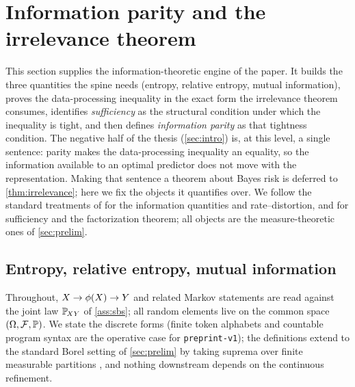\section{Information parity and the irrelevance theorem}
\label{sec:parity}

%

This section supplies the information-theoretic engine of the paper. It builds
the three quantities the spine needs (entropy, relative entropy, mutual
information), proves the data-processing inequality in the exact form the
irrelevance theorem consumes, identifies \emph{sufficiency} as the structural
condition under which the inequality is tight, and then defines
\emph{information parity} as that tightness condition. The negative half of
the thesis (\cref{sec:intro}) is, at this level, a single sentence: parity
makes the data-processing inequality an equality, so the information available
to an optimal predictor does not move with the representation. Making that
sentence a theorem about Bayes risk is deferred to \cref{thm:irrelevance}; here we fix the
objects it quantifies over. We follow the standard treatments of
\citet{coverthomas2006} for the information quantities and rate--distortion,
and \citet{lehmanncasella1998} for sufficiency and the factorization theorem;
all objects are the measure-theoretic ones of \cref{sec:prelim}.

\subsection{Entropy, relative entropy, mutual information}
\label{subsec:infoquantities}

Throughout, $X \rightarrow \phi(X) \rightarrow Y$ and related Markov statements are
read against the joint law $\mathbb{P}_{\!XY}$ of \cref{ass:sbs}; all random elements live
on the common space $(\Omega,\mathcal{F},\mathbb{P})$. We state the discrete forms
(finite token alphabets and countable program syntax are the operative case
for \texttt{preprint-v1}); the definitions extend to the standard Borel
setting of \cref{sec:prelim} by taking suprema over finite measurable
partitions \citep[Ch.~8]{coverthomas2006}, and nothing downstream depends on
the continuous refinement.

